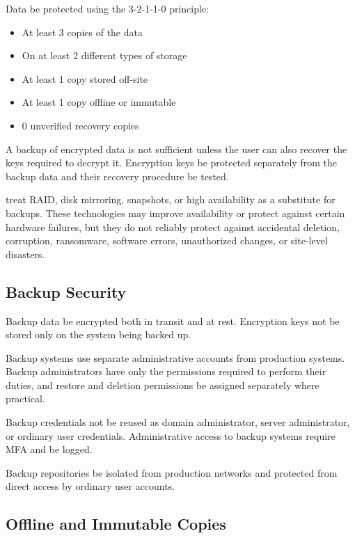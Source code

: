 Data \should{} be protected using the 3-2-1-1-0 principle:
\begin{itemize}
    \item At least 3 copies of the data
    \item On at least 2 different types of storage
    \item At least 1 copy stored off-site
    \item At least 1 copy offline or immutable
    \item 0 unverified recovery copies
\end{itemize}

A backup of encrypted data is not sufficient unless the user can also recover the keys required to decrypt it. Encryption keys \must{} be protected separately from the backup data and their recovery procedure \must{} be tested.

\donot{} treat RAID, disk mirroring, snapshots, or high availability as a substitute for backups. These technologies may improve availability or protect against certain hardware failures, but they do not reliably protect against accidental deletion, corruption, ransomware, software errors, unauthorized changes, or site-level disasters.

\subsection{Backup Security}

Backup data \must{} be encrypted both in transit and at rest. Encryption keys \must{} not be stored only on the system being backed up.

Backup systems \must{} use separate administrative accounts from production systems. Backup administrators \should{} have only the permissions required to perform their duties, and restore and deletion permissions \should{} be assigned separately where practical.

Backup credentials \must{} not be reused as domain administrator, server administrator, or ordinary user credentials. Administrative access to backup systems \should{} require MFA and \should{} be logged.

Backup repositories \should{} be isolated from production networks and protected from direct access by ordinary user accounts.

\subsection{Offline and Immutable Copies}

